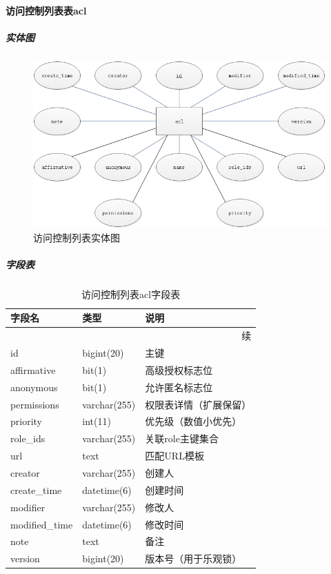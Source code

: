 \documentclass[titlepage,UTF8,linespread=1.5]{ctexart}
\begin{document}
\paragraph{访问控制列表表acl}
\subparagraph{实体图}
\begin{figure}[H]
    \centering
    \includegraphics[width=140mm]{entity-acl.png}
    \caption{访问控制列表实体图}
    \label{fig:entity-acl}
\end{figure}
\subparagraph{字段表}
\begin{longtable}{|p{10em}|p{6em}|p{15em}|}
    \caption{访问控制列表acl字段表}\label{tab:table_acl}   \\\hline
    字段名         & 类型         & 说明                   \\\hline
    \endfirsthead
    \multicolumn{3}{r}{{续\tablename\thetable{}}}          \\\hline
    \endhead
    id             & bigint(20)   & 主键                   \\\hline
    affirmative    & bit(1)       & 高级授权标志位         \\\hline
    anonymous      & bit(1)       & 允许匿名标志位         \\\hline
    permissions    & varchar(255) & 权限表详情（扩展保留） \\\hline
    priority       & int(11)      & 优先级（数值小优先）   \\\hline
    role\_ids      & varchar(255) & 关联role主键集合       \\\hline
    url            & text         & 匹配URL模板            \\\hline
    creator        & varchar(255) & 创建人                 \\\hline
    create\_time   & datetime(6)  & 创建时间               \\\hline
    modifier       & varchar(255) & 修改人                 \\\hline
    modified\_time & datetime(6)  & 修改时间               \\\hline
    note           & text         & 备注                   \\\hline
    version        & bigint(20)   & 版本号（用于乐观锁）   \\\hline
\end{longtable}\par
\end{document}
